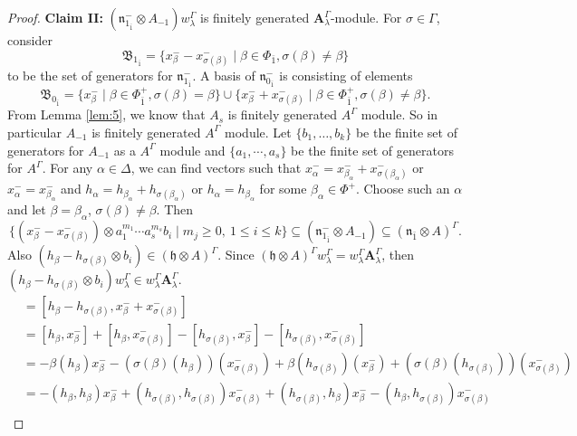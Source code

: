 \documentclass[11pt]{amsart}
\theoremstyle{plain}
\theoremstyle{definition}
\newcommand{\h}{\mathfrak{h}}
\newcommand{\n}{\mathfrak{n}}
\newcommand{\A}{\mathbf{A}_{\lambda}^{\Gamma}}
\begin{document}
\begin{proof}
{\bf Claim II:} $(\n^{-}_{1_{\bar{1}}}\otimes A_{-1})w_{\lambda}^{\Gamma}$ is finitely generated $\A$-module. For $\sigma \in \Gamma$, consider \[\mathfrak{B}_{1_{\bar{1}}}=\{x_{\beta}^{-}-x_{\sigma(\beta)}^{-}\mid \beta\in \Phi_{\bar{1}},\sigma(\beta)\neq\beta\}\] to be the set of generators for $\n^{-}_{1_{\bar{1}}}$. A basis of $\n_{0_{\bar{1}}}^{-}$ is consisting of elements \[\mathfrak{B}_{0_{\bar{1}}}=\{x_{\beta}^{-}\mid\beta\in \Phi^{+}_{\bar{1}}, \sigma(\beta)=\beta\}\cup\{x_{\beta}^{-}+x_{\sigma(\beta)}^{-}\mid\beta\in \Phi_{\bar{1}}^{+},\sigma(\beta)\neq\beta\}.\]
From Lemma \ref{lem:5}, we know that $A_{s}$ is finitely generated $A^{\Gamma}$ module. So in particular $A_{-1}$ is finitely generated $A^{\Gamma}$ module. Let $\{b_{1},\ldots, b_{k}\}$ be the finite set of generators for $A_{-1}$ as a $A^{\Gamma}$ module and $\{a_{1},\cdots,a_{s}\}$ be the finite set of generators for $A^{\Gamma}$. For any $\alpha\in\Delta$, we can find vectors such that $x_{\alpha}^{-}=x_{\beta_{\alpha}}^{-}+x_{\sigma(\beta_{\alpha})}^{-}$ or $x_{\alpha}^{-}=x_{\beta_{\alpha}}^{-}$ and $h_{\alpha}=h_{\beta_{\alpha}}+h_{\sigma(\beta_{\alpha})}$ or $h_{\alpha}=h_{\beta_{\alpha}}$ for some $\beta_{\alpha}\in \Phi^{+}$. Choose such an $\alpha$ and let $\beta=\beta_{\alpha}$, $\sigma(\beta)\neq\beta$. Then
\begin{equation*}
        \{(x^{-}_{\beta} -x^{-}_{\sigma(\beta)})\otimes a_{1}^{m_{1} }\cdots a_{s}^{m_{s}}b_{i} \mid m_{j}\geq 0,~ 1\leq i\leq k\}\subseteq(\n^{-}_{1_{\bar{1}}}\otimes A_{-1})\subseteq(\n_{\bar{1}}\otimes A)^{\Gamma}.
    \end{equation*}
Also $(h_{\beta}-h_{\sigma({\beta})}\otimes b_{i})\in(\h\otimes A)^{\Gamma}$. Since $(\h\otimes A)^{\Gamma}w_{\lambda}^{\Gamma}=w_{\lambda}^{\Gamma}\A$, then $(h_{\beta}-h_{\sigma(\beta)}\otimes b_{i})w_{\lambda}^{\Gamma}\in w_{\lambda}^{\Gamma}\A$.
\begin{align*}
[h_{\beta}-h_{\sigma(\beta)}, x_{\alpha}^{-}]&=[h_{\beta}-h_{\sigma(\beta)}, x_{\beta}^{-}+x_{\sigma(\beta)}^{-}]\\
&=[h_{\beta}, x_{\beta}^{-}]+[h_{\beta}, x_{\sigma(\beta)}^{-}]-[h_{\sigma(\beta)}, x_{\beta}^{-}]-[h_{\sigma(\beta)}, x_{\sigma(\beta)}^{-}]\\
&= -\beta(h_{\beta})x^{-}_{\beta}-(\sigma(\beta)(h_{\beta}))(x_{\sigma(\beta)}^{-})+\beta(h_{\sigma(\beta)})(x^{-}_{\beta})+(\sigma(\beta)(h_{\sigma(\beta)}))(x^{-}_{\sigma(\beta)})\\
&=-(h_{\beta}, h_{\beta})x^{-}_{\beta}+(h_{\sigma(\beta)}, h_{\sigma(\beta)})x^{-}_{\sigma(\beta)}+(h_{\sigma(\beta)},h_{\beta})x^{-}_{\beta}-(h_{\beta}, h_{\sigma(\beta)})x^{-}_{\sigma(\beta)}\\

\end{align*}
\end{proof}
\end{document}
